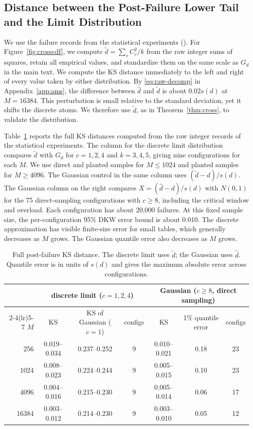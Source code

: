 \subsection{Distance between the Post-Failure Lower Tail and the Limit Distribution}\label{app:limit}
We use the failure records from the statistical experiments (). For Figure~\ref{fig:crosscdf}, we compute $\widetilde d=\sum_vC_v^2/k$ from the raw integer sums of squares, retain all empirical values, and standardize them on the same scale as $G_d$ in the main text. We compute the KS distance immediately to the left and right of every value taken by either distribution. By \eqref{eq:raw-decomp} in Appendix~\ref{app:ams}, the difference between $\widehat d$ and $\widetilde d$ is about $0.02s(d)$ at $M=16384$. This perturbation is small relative to the standard deviation, yet it shifts the discrete atoms. We therefore use $\widetilde d$, as in Theorem~\ref{thm:cross}, to validate the distribution.

Table~\ref{tab:limit-ks} reports the full KS distances computed from the raw integer records of the statistical experiments. The column for the discrete limit distribution compares $\widetilde d$ with $G_d$ for $c=1,2,4$ and $k=3,4,5$, giving nine configurations for each $M$. We use direct and planted samples for $M\le1024$ and planted samples for $M\ge4096$. The Gaussian control in the same column uses $(\widetilde d-d)/s(d)$. The Gaussian column on the right compares $X=(\widehat d-d)/s(d)$ with $N(0,1)$ for the 75 direct-sampling configurations with $c\ge8$, including the critical window and overload. Each configuration has about 20{,}000 failures. At this fixed sample size, the per-configuration 95\% DKW error bound is about 0.010. The discrete approximation has visible finite-size error for small tables, which generally decreases as $M$ grows. The Gaussian quantile error also decreases as $M$ grows.

\begin{table}[!htbp]
\centering
\caption{Full post-failure KS distance. The discrete limit uses $\widetilde d$; the Gaussian uses $\widehat d$. Quantile error is in units of $s(d)$ and gives the maximum absolute error across configurations.}
\label{tab:limit-ks}
\small
\begin{tabular}{rcccccc}
\toprule
& \multicolumn{3}{c}{discrete limit ($c=1,2,4$)} & \multicolumn{3}{c}{Gaussian ($c\ge8$, direct sampling)}\\
\cmidrule(lr){2-4}\cmidrule(lr){5-7}
$M$ & KS & KS of Gaussian ($c=1$) & configs & KS & 1\% quantile error & configs\\
\midrule
256 & 0.019--0.034 & 0.237--0.252 & 9 & 0.010--0.021 & 0.18 & 23\\
1024 & 0.008--0.023 & 0.224--0.244 & 9 & 0.005--0.015 & 0.10 & 23\\
4096 & 0.004--0.016 & 0.215--0.230 & 9 & 0.005--0.014 & 0.06 & 17\\
16384 & 0.003--0.012 & 0.214--0.230 & 9 & 0.003--0.010 & 0.05 & 12\\
\bottomrule
\end{tabular}
\end{table}

